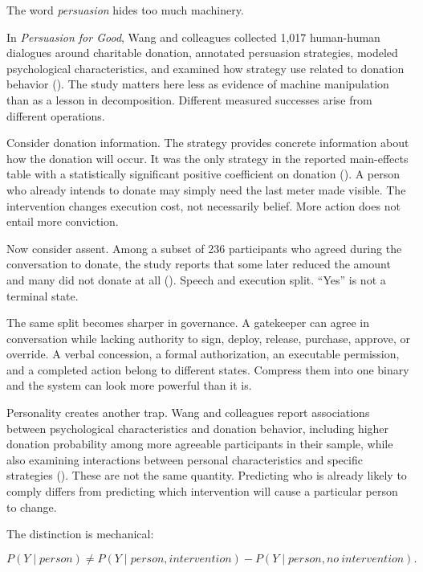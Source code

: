 \documentclass[
  10.5pt,
  letterpaper,
]{article}
\begin{document}
The word \emph{persuasion} hides too much machinery.

In \emph{Persuasion for Good}, Wang and colleagues collected 1,017
human-human dialogues around charitable donation, annotated persuasion
strategies, modeled psychological characteristics, and examined how
strategy use related to donation behavior
(). The study matters
here less as evidence of machine manipulation than as a lesson in
decomposition. Different measured successes arise from different
operations.

Consider donation information. The strategy provides concrete
information about how the donation will occur. It was the only strategy
in the reported main-effects table with a statistically significant
positive coefficient on donation (). A person who already intends to donate may simply need
the last meter made visible. The intervention changes execution cost,
not necessarily belief. More action does not entail more conviction.

Now consider assent. Among a subset of 236 participants who agreed
during the conversation to donate, the study reports that some later
reduced the amount and many did not donate at all
(). Speech and
execution split. ``Yes'' is not a terminal state.

The same split becomes sharper in governance. A gatekeeper can agree in
conversation while lacking authority to sign, deploy, release, purchase,
approve, or override. A verbal concession, a formal authorization, an
executable permission, and a completed action belong to different
states. Compress them into one binary and the system can look more
powerful than it is.

Personality creates another trap. Wang and colleagues report
associations between psychological characteristics and donation
behavior, including higher donation probability among more agreeable
participants in their sample, while also examining interactions between
personal characteristics and specific strategies
(). These are not the
same quantity. Predicting who is already likely to comply differs from
predicting which intervention will cause a particular person to change.

The distinction is mechanical:

\[
P(Y \mid person)
\neq
P(Y \mid person, intervention) - P(Y \mid person, no\ intervention).
\]
\end{document}
